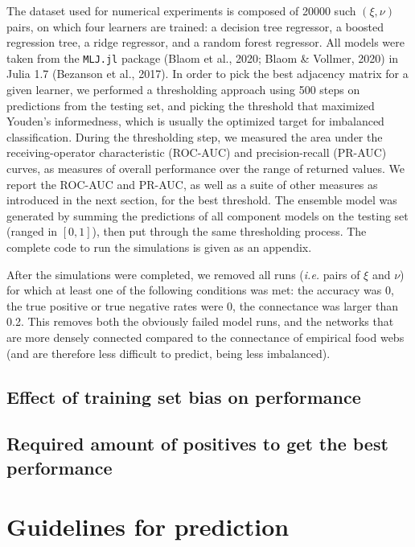 \documentclass[11pt]{article}
\begin{document}
The dataset used for numerical experiments is composed of 20000 such
\((\xi, \nu)\) pairs, on which four learners are trained: a decision
tree regressor, a boosted regression tree, a ridge regressor, and a
random forest regressor. All models were taken from the \texttt{MLJ.jl}
package (Blaom et al., 2020; Blaom \& Vollmer, 2020) in Julia 1.7
(Bezanson et al., 2017). In order to pick the best adjacency matrix for
a given learner, we performed a thresholding approach using 500 steps on
predictions from the testing set, and picking the threshold that
maximized Youden's informedness, which is usually the optimized target
for imbalanced classification. During the thresholding step, we measured
the area under the receiving-operator characteristic (ROC-AUC) and
precision-recall (PR-AUC) curves, as measures of overall performance
over the range of returned values. We report the ROC-AUC and PR-AUC, as
well as a suite of other measures as introduced in the next section, for
the best threshold. The ensemble model was generated by summing the
predictions of all component models on the testing set (ranged in
\([0,1]\)), then put through the same thresholding process. The complete
code to run the simulations is given as an appendix.

After the simulations were completed, we removed all runs (\emph{i.e.}
pairs of \(\xi\) and \(\nu\)) for which at least one of the following
conditions was met: the accuracy was 0, the true positive or true
negative rates were 0, the connectance was larger than 0.2. This removes
both the obviously failed model runs, and the networks that are more
densely connected compared to the connectance of empirical food webs
(and are therefore less difficult to predict, being less imbalanced).

\hypertarget{effect-of-training-set-bias-on-performance}{%
\subsection{Effect of training set bias on
performance}\label{effect-of-training-set-bias-on-performance}}

\hypertarget{required-amount-of-positives-to-get-the-best-performance}{%
\subsection{Required amount of positives to get the best
performance}\label{required-amount-of-positives-to-get-the-best-performance}}

\hypertarget{guidelines-for-prediction}{%
\section{Guidelines for prediction}\label{guidelines-for-prediction}}
\end{document}
